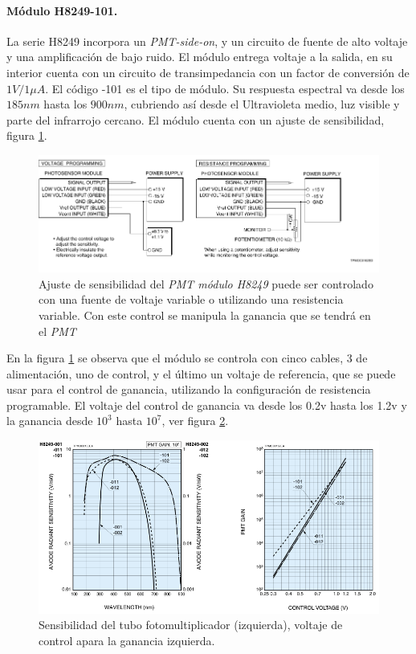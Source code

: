 \paragraph{Módulo H8249-101.}
La serie H8249 incorpora un \textit{PMT-side-on}, y un circuito de fuente de alto voltaje y una amplificación de bajo ruido. El módulo entrega voltaje a la salida, en su interior cuenta con un circuito de transimpedancia con un factor de conversión de $1V/1\mu A$. El código -101 es el tipo de módulo. Su respuesta espectral va desde los $185nm$ hasta los $900nm$, cubriendo así desde el Ultravioleta medio, luz visible y parte del infrarrojo cercano.
El módulo cuenta con un ajuste de sensibilidad, figura \ref{fig:sensibilidadajuste}.

\begin{figure}[h]
	\centering
	\includegraphics[width=0.8\linewidth]{Imagenes/2/SensibilidadAjuste}
	\caption[Ajuste de sensibilidad del \textit{PMT módulo H8249}]{Ajuste de sensibilidad del \textit{PMT módulo H8249} puede ser controlado con una fuente de voltaje variable o utilizando una resistencia variable. Con este control se manipula la ganancia que se tendrá en el \textit{PMT}\cite{Hamamatsu2008}}
	\label{fig:sensibilidadajuste}
\end{figure}

 En la figura \ref{fig:sensibilidadajuste} se observa que el módulo se controla con cinco cables, 3 de alimentación, uno de control, y el último un voltaje de referencia, que se puede usar para el control de ganancia, utilizando la configuración de resistencia programable. El voltaje del control de ganancia va desde los 0.2v hasta los 1.2v y la ganancia desde $10^{3}$ hasta $10^{7}$, ver figura \ref{fig:pmtgain}.
 \begin{figure}
 	\centering
 	\includegraphics[width=0.7\linewidth]{Imagenes/2/PMT_GAIN}
 	\caption[Sensibilidad y ganancia H8249]{Sensibilidad del tubo fotomultiplicador (izquierda), voltaje de control apara la ganancia izquierda. \cite{Hamamatsu2008}}
 	\label{fig:pmtgain}
 \end{figure}

